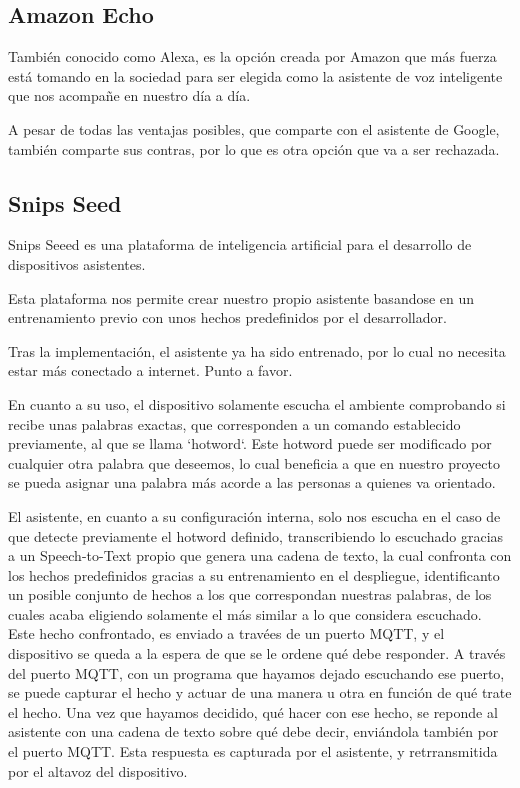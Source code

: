 \subsection{Amazon Echo}

También conocido como Alexa, es la opción creada por Amazon que más fuerza está tomando en la sociedad para ser elegida como la asistente de voz inteligente que nos acompañe en nuestro día a día.

A pesar de todas las ventajas posibles, que comparte con el asistente de Google, también comparte sus contras, por lo que es otra opción que va a ser rechazada.

\subsection{Snips Seed}

Snips Seeed es una  plataforma de inteligencia artificial para el desarrollo de dispositivos asistentes.

Esta plataforma nos permite crear nuestro propio asistente basandose en un entrenamiento previo con unos hechos predefinidos por el desarrollador.

Tras la implementación, el asistente ya ha sido entrenado, por lo cual no necesita estar más conectado a internet. Punto a favor.

En cuanto a su uso, el dispositivo solamente escucha el ambiente comprobando si recibe unas palabras exactas, que corresponden a un comando establecido previamente, al que se llama ‘hotword‘. 
Este hotword puede ser modificado por cualquier otra palabra que deseemos, lo cual beneficia a que en nuestro proyecto se pueda asignar una palabra más acorde a las personas a quienes va orientado.

El asistente, en cuanto a su configuración interna, solo nos escucha en el caso de que detecte previamente el hotword definido, transcribiendo lo escuchado gracias a un Speech-to-Text propio que genera una cadena de texto, la cual confronta con los hechos predefinidos gracias a su entrenamiento en el despliegue, identificanto un posible conjunto de hechos a los que correspondan nuestras palabras, de los cuales acaba eligiendo solamente el más similar a lo que considera escuchado.
Este hecho confrontado, es enviado a travées de un puerto MQTT, y el dispositivo se queda a la espera de que se le ordene qué debe responder.
A través del puerto MQTT, con un programa que hayamos dejado escuchando ese puerto, se puede capturar el hecho y actuar de una manera u otra en función de qué trate el hecho.
Una vez que hayamos decidido, qué hacer con ese hecho, se reponde al asistente con una cadena de texto sobre qué debe decir, enviándola también por el puerto MQTT.
Esta respuesta es capturada por el asistente, y retrransmitida por el altavoz del dispositivo.

